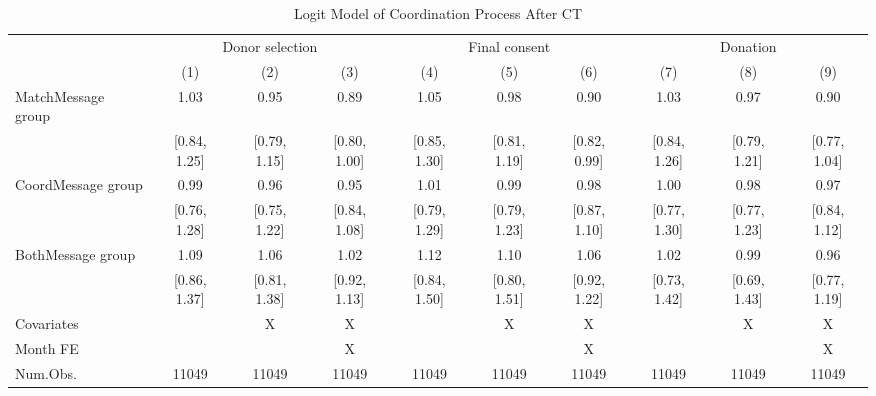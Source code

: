 \documentclass[12pt, a4paper]{article}
\begin{document}
\clearpage

\begin{landscape}\begin{table}[H]
\centering\centering
\caption{\label{tab:logit-coordinate}Logit Model of Coordination Process After CT}
\centering
\fontsize{8}{10}\selectfont
\begin{threeparttable}
\begin{tabular}[t]{lccccccccc}
\toprule
\multicolumn{1}{c}{ } & \multicolumn{3}{c}{Donor selection} & \multicolumn{3}{c}{Final consent} & \multicolumn{3}{c}{Donation} \\
\cmidrule(l{3pt}r{3pt}){2-4} \cmidrule(l{3pt}r{3pt}){5-7} \cmidrule(l{3pt}r{3pt}){8-10}
  & (1) & (2) & (3) & (4) & (5) & (6) & (7) & (8) & (9)\\
\midrule
MatchMessage group & \num{1.03} & \num{0.95} & \num{0.89} & \num{1.05} & \num{0.98} & \num{0.90} & \num{1.03} & \num{0.97} & \num{0.90}\\
 & {}[\num{0.84}, \num{1.25}] & {}[\num{0.79}, \num{1.15}] & {}[\num{0.80}, \num{1.00}] & {}[\num{0.85}, \num{1.30}] & {}[\num{0.81}, \num{1.19}] & {}[\num{0.82}, \num{0.99}] & {}[\num{0.84}, \num{1.26}] & {}[\num{0.79}, \num{1.21}] & {}[\num{0.77}, \num{1.04}]\\
CoordMessage group & \num{0.99} & \num{0.96} & \num{0.95} & \num{1.01} & \num{0.99} & \num{0.98} & \num{1.00} & \num{0.98} & \num{0.97}\\
 & {}[\num{0.76}, \num{1.28}] & {}[\num{0.75}, \num{1.22}] & {}[\num{0.84}, \num{1.08}] & {}[\num{0.79}, \num{1.29}] & {}[\num{0.79}, \num{1.23}] & {}[\num{0.87}, \num{1.10}] & {}[\num{0.77}, \num{1.30}] & {}[\num{0.77}, \num{1.23}] & {}[\num{0.84}, \num{1.12}]\\
BothMessage group & \num{1.09} & \num{1.06} & \num{1.02} & \num{1.12} & \num{1.10} & \num{1.06} & \num{1.02} & \num{0.99} & \num{0.96}\\
 & {}[\num{0.86}, \num{1.37}] & {}[\num{0.81}, \num{1.38}] & {}[\num{0.92}, \num{1.13}] & {}[\num{0.84}, \num{1.50}] & {}[\num{0.80}, \num{1.51}] & {}[\num{0.92}, \num{1.22}] & {}[\num{0.73}, \num{1.42}] & {}[\num{0.69}, \num{1.43}] & {}[\num{0.77}, \num{1.19}]\\
\midrule
Covariates &  & X & X &  & X & X &  & X & X\\
Month FE &  &  & X &  &  & X &  &  & X\\
Num.Obs. & \num{11049} & \num{11049} & \num{11049} & \num{11049} & \num{11049} & \num{11049} & \num{11049} & \num{11049} & \num{11049}\\

\end{tabular}
\end{threeparttable}
\end{table}
\end{landscape}
\end{document}
